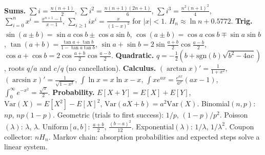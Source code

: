 {\small
\textbf{Sums.} $\sum i = \frac{n(n+1)}{2}$, $\sum i^2 = \frac{n(n+1)(2n+1)}{6}$, $\sum i^3 = \frac{n^2(n+1)^2}{4}$, $\sum_{i=0}^{n} x^i = \frac{x^{n+1} - 1}{x - 1}$, $\sum_{i \ge 1} i x^{i} = \frac{x}{(1-x)^2}$ for $|x| < 1$. $H_n \approx \ln n + 0.5772$.
\textbf{Trig.} $\sin(a \pm b) = \sin a\cos b \pm \cos a\sin b$, $\cos(a \pm b) = \cos a\cos b \mp \sin a\sin b$, $\tan(a + b) = \frac{\tan a + \tan b}{1 - \tan a\tan b}$, $\sin a + \sin b = 2\sin\frac{a+b}{2}\cos\frac{a-b}{2}$, $\cos a + \cos b = 2\cos\frac{a+b}{2}\cos\frac{a-b}{2}$.
\textbf{Quadratic.} $q = -\frac12(b + \mathrm{sgn}(b)\sqrt{b^2 - 4ac})$, roots $q/a$ and $c/q$ (no cancellation).
\textbf{Calculus.} $(\arctan x)' = \frac{1}{1+x^2}$, $(\arcsin x)' = \frac{1}{\sqrt{1-x^2}}$, $\int \ln x = x\ln x - x$, $\int x e^{ax} = \frac{e^{ax}}{a^2}(ax - 1)$, $\int_0^\infty e^{-x^2} = \frac{\sqrt\pi}{2}$.
\textbf{Probability.} $E[X + Y] = E[X] + E[Y]$, $\mathrm{Var}(X) = E[X^2] - E[X]^2$, $\mathrm{Var}(aX + b) = a^2\mathrm{Var}(X)$. Binomial$(n, p)$: $np$, $np(1-p)$. Geometric (trials to first success): $1/p$, $(1-p)/p^2$. Poisson$(\lambda)$: $\lambda$, $\lambda$. Uniform$[a, b]$: $\frac{a+b}{2}$, $\frac{(b-a)^2}{12}$. Exponential$(\lambda)$: $1/\lambda$, $1/\lambda^2$. Coupon collector: $nH_n$. Markov chain: absorption probabilities and expected steps solve a linear system.
\par}
